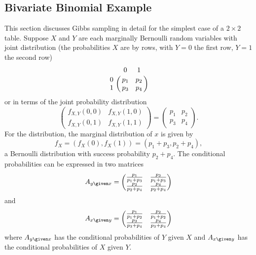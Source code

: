 \documentclass[12pt]{article}
\begin{document}
\subsection*{Bivariate Binomial Example}

This section discusses Gibbs sampling in detail for the simplest case of
a \( 2 \times 2 \) table.  Suppose \( X \) and \( Y \) are each
marginally Bernoulli random variables with joint distribution
(the probabilities $X$ are by rows, with $Y=0$ the first row, $Y=1$
the second row)
\[
    \bordermatrix{ & 0 & 1 \cr
    0 & p_1 & p_2 \cr
    1 & p_3 & p_4}
\] or in terms of the joint probability distribution
\[
    \begin{pmatrix}
        f_{X,Y}(0,0) & f_{X,Y}(1,0) \\
        f_{X,Y}(0,1) & f_{X,Y}(1,1)
    \end{pmatrix}
    =
    \begin{pmatrix}
        p_1 & p_2 \\
        p_3 & p_4
    \end{pmatrix}
    .
\] For the distribution, the marginal distribution of \( x \) is given
by
\[
    f_X = (f_X(0), f_X(1)) = (p_1 + p_3, p_2 + p_4),
\] a Bernoulli distribution with success probability \( p_2 + p_4 \).
The conditional probabilities can be expressed in two matrices
\[
    A_{y \given x} =
    \begin{pmatrix}
        \frac{p_1}{p_1 + p_3} & \frac{p_3}{p_1 + p_3} \\
        \frac{p_2}{p_2 + p_4} & \frac{p_4}{p_2 + p_4}
    \end{pmatrix}
\] and
\[
    A_{x \given y} =
    \begin{pmatrix}
        \frac{p_1}{p_1 + p_2} & \frac{p_2}{p_1 + p_2} \\
        \frac{p_3}{p_3 + p_4} & \frac{p_4}{p_3 + p_4}
    \end{pmatrix}
\] where \( A_{y \given x} \) has the conditional probabilities of \( Y \)
given \( X \) and \( A_{x \given y} \) has the conditional probabilities
of \( X \) given \( Y \).
\end{document}
